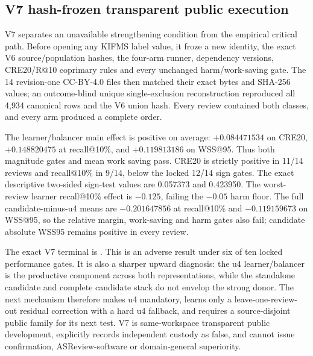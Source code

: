 \subsection{V7 hash-frozen transparent public execution}

V7 separates an unavailable strengthening condition from the empirical
critical path. Before opening any KIFMS label value, it froze a new identity,
the exact V6 source/population hashes, the four-arm runner, dependency versions,
CRE20/R@10 coprimary rules and every unchanged harm/work-saving gate. The 14
revision-one CC-BY-4.0 files then matched their exact bytes and SHA-256 values;
an outcome-blind unique single-exclusion reconstruction reproduced all 4,934
canonical rows and the V6 union hash. Every review contained both
 classes, and every arm produced a complete order.

The learner/balancer main effect is positive on average: $+0.084471534$ on
CRE20, $+0.148820475$ at recall@10\%, and $+0.119813186$ on WSS@95. Thus both
magnitude gates and mean work saving pass. CRE20 is strictly positive in 11/14
reviews and recall@10\% in 9/14, below the locked 12/14 sign gates. The exact
descriptive two-sided sign-test values are 0.057373 and 0.423950. The
worst-review learner recall@10\% effect is $-0.125$, failing the $-0.05$ harm
floor. The full candidate-minus-u4 means are $-0.201647856$ at recall@10\% and
$-0.119159673$ on WSS@95, so the relative margin, work-saving and harm gates
also fail; candidate absolute WSS95 remains positive in every review.

The exact V7 terminal is
.
This is an adverse result under six of ten locked performance gates. It is also
a sharper upward diagnosis: the u4 learner/balancer is the productive component
across both representations, while the standalone candidate and complete
candidate stack do not envelop the strong donor. The next mechanism therefore
makes u4 mandatory, learns only a leave-one-review-out residual correction with
a hard u4 fallback, and requires a source-disjoint public family for its next
test. V7 is same-workspace transparent public development, explicitly records
independent custody as false, and cannot issue confirmation, ASReview-software
or domain-general superiority.
